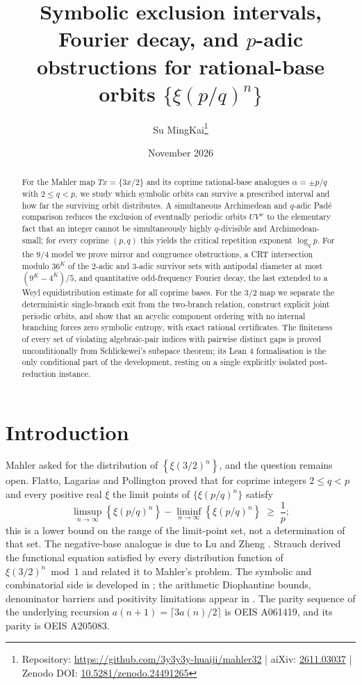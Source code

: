 \documentclass[11pt,a4paper]{article}
\title{Symbolic exclusion intervals, Fourier decay, and \texorpdfstring{$p$}{p}-adic obstructions for rational-base orbits \texorpdfstring{$\{\xi(p/q)^{n}\}$}{xi(p/q)^n}}
\author{Su MingKai\thanks{Repository: \url{https://github.com/3y3y3y-huaiji/mahler32} \;|\; aiXiv: \href{https://aixiv.online/abs/2611.03037}{2611.03037} \;|\; Zenodo DOI: \href{https://doi.org/10.5281/zenodo.24491265}{10.5281/zenodo.24491265}}}
\date{November 2026}
\theoremstyle{remark}
\newcommand{\fract}[1]{\left\{#1\right\}}
\begin{document}
\maketitle

\begin{abstract}
For the Mahler map $T x = \{3x/2\}$ and its coprime rational-base analogues $\alpha = \pm p/q$ with $2 \le q < p$, we study which symbolic orbits can survive a prescribed interval and how far the surviving orbit distributes. A simultaneous Archimedean and $q$-adic Padé comparison reduces the exclusion of eventually periodic orbits $U V^{w}$ to the elementary fact that an integer cannot be simultaneously highly $q$-divisible and Archimedean-small; for every coprime $(p,q)$ this yields the critical repetition exponent $\log_{q} p$. For the $9/4$ model we prove mirror and congruence obstructions, a CRT intersection modulo $36^{K}$ of the $2$-adic and $3$-adic survivor sets with antipodal diameter at most $(9^{K} - 4^{K})/5$, and quantitative odd-frequency Fourier decay, the last extended to a Weyl equidistribution estimate for all coprime bases. For the $3/2$ map we separate the deterministic single-branch exit from the two-branch relation, construct explicit joint periodic orbits, and show that an acyclic component ordering with no internal branching forces zero symbolic entropy, with exact rational certificates. The finiteness of every set of violating algebraic-pair indices with pairwise distinct gaps is proved unconditionally from Schlickewei's subspace theorem; its Lean 4 formalisation is the only conditional part of the development, resting on a single explicitly isolated post-reduction instance.
\end{abstract}

\setcounter{tocdepth}{1}
\tableofcontents

\section{Introduction}
\label{sec:intro}

Mahler \citep{mahler1968} asked for the distribution of $\fract{\xi(3/2)^{n}}$, and the question remains open. Flatto, Lagarias and Pollington \citep{flp1995} proved that for coprime integers $2 \le q < p$ and every positive real $\xi$ the limit points of $\{\xi(p/q)^{n}\}$ satisfy
\[
  \limsup_{n\to\infty} \fract{\xi(p/q)^{n}} - \liminf_{n\to\infty} \fract{\xi(p/q)^{n}} \;\ge\; \frac{1}{p};
\]
this is a lower bound on the range of the limit-point set, not a determination of that set. The negative-base analogue is due to Lu and Zheng \citep{luzheng2026}. Strauch \citep{strauch1997} derived the functional equation satisfied by every distribution function of $\xi(3/2)^{n} \bmod 1$ and related it to Mahler's problem. The symbolic and combinatorial side is developed in \citep{lagarias2003,andrieu2025,cassaigne2026}; the arithmetic Diophantine bounds, denominator barriers and positivity limitations appear in \citep{stephan2026subspace,stephan2026minimal,stephan2026third,cook2026,calegari2025,elmv,dedeo2026}. The parity sequence of the underlying recursion $a(n+1) = \lceil 3a(n)/2 \rceil$ is OEIS A061419, and its parity is OEIS A205083.
\end{document}
